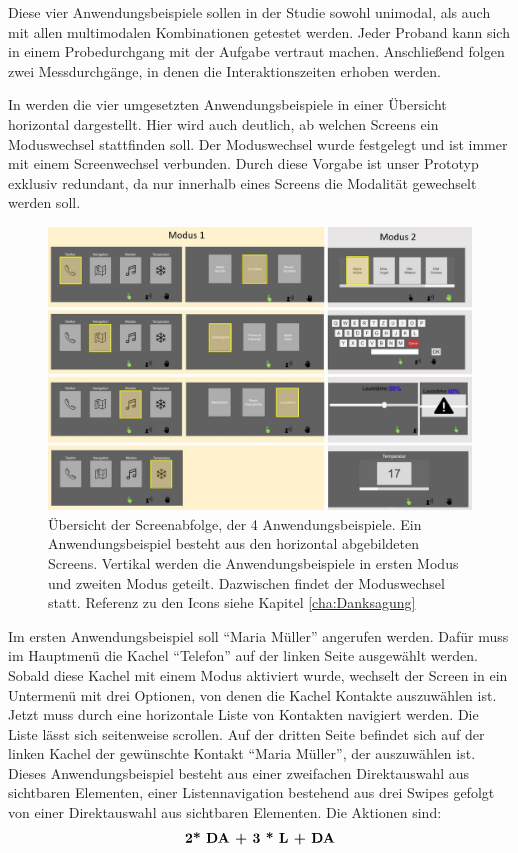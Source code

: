 Diese vier Anwendungsbeispiele sollen in der Studie sowohl unimodal, als auch mit allen multimodalen Kombinationen getestet werden. 
Jeder Proband kann sich in einem Probedurchgang mit der Aufgabe vertraut machen.
Anschließend folgen zwei Messdurchgänge, in denen die Interaktionszeiten erhoben werden. 

In  werden die vier umgesetzten Anwendungsbeispiele in einer Übersicht horizontal dargestellt. 
Hier wird auch deutlich, ab welchen Screens ein Moduswechsel stattfinden soll. 
Der Moduswechsel wurde festgelegt und ist immer mit einem Screenwechsel verbunden. 
Durch diese Vorgabe ist unser Prototyp exklusiv redundant, da nur innerhalb eines Screens die Modalität gewechselt werden soll. 
\begin{figure}[ht]
  \centering
  \includegraphics[width=1\textwidth]{img/UseCases2.jpg}
  \caption[Übersicht der Screenabfolge, der 4 Anwendungsbeispiele.]{Übersicht der Screenabfolge, der 4 Anwendungsbeispiele. Ein Anwendungsbeispiel besteht aus den horizontal abgebildeten Screens. Vertikal werden die Anwendungsbeispiele in ersten Modus und zweiten Modus geteilt. Dazwischen findet der Moduswechsel statt. Referenz zu den Icons siehe Kapitel \ref{cha:Danksagung}}
  \label{fig:UseCases}
\end{figure}

Im ersten Anwendungsbeispiel soll "`Maria Müller"' angerufen werden. Dafür muss im Hauptmenü die Kachel "`Telefon"' auf der linken Seite ausgewählt werden. 
Sobald diese Kachel mit einem Modus aktiviert wurde, wechselt der Screen in ein Untermenü mit drei Optionen, von denen die Kachel Kontakte auszuwählen ist. 
Jetzt muss durch eine horizontale Liste von Kontakten navigiert werden. 
Die Liste lässt sich seitenweise scrollen. 
Auf der dritten Seite befindet sich auf der linken Kachel der gewünschte Kontakt "`Maria Müller"', der auszuwählen ist. 
Dieses Anwendungsbeispiel besteht aus einer zweifachen Direktauswahl aus sichtbaren Elementen, einer Listennavigation bestehend aus drei Swipes gefolgt von einer Direktauswahl aus sichtbaren Elementen. 
Die Aktionen sind:
$$\textbf{2* \text{DA} + 3 * \text{L} + \text{DA}}$$

